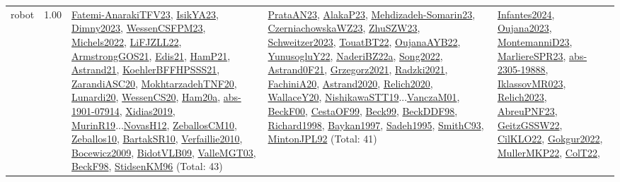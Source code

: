 {\begin{longtable}{p{3cm}r>{\raggedright\arraybackslash}p{6cm}>{\raggedright\arraybackslash}p{6cm}>{\raggedright\arraybackslash}p{8cm}}
\index{robot}\index{ApplicationAreas!robot}robot &  1.00 & \hyperref[detail:Fatemi-AnarakiTFV23]{Fatemi-AnarakiTFV23}, \hyperref[detail:IsikYA23]{IsikYA23}, \hyperref[detail:Dimny2023]{Dimny2023}, \hyperref[detail:WessenCSFPM23]{WessenCSFPM23}, \hyperref[detail:Michels2022]{Michels2022}, \hyperref[detail:LiFJZLL22]{LiFJZLL22}, \hyperref[detail:ArmstrongGOS21]{ArmstrongGOS21}, \hyperref[detail:Edis21]{Edis21}, \hyperref[detail:HamP21]{HamP21}, \hyperref[detail:Astrand21]{Astrand21}, \hyperref[detail:KoehlerBFFHPSSS21]{KoehlerBFFHPSSS21}, \hyperref[detail:ZarandiASC20]{ZarandiASC20}, \hyperref[detail:MokhtarzadehTNF20]{MokhtarzadehTNF20}, \hyperref[detail:Lunardi20]{Lunardi20}, \hyperref[detail:WessenCS20]{WessenCS20}, \hyperref[detail:Ham20a]{Ham20a}, \hyperref[detail:abs-1901-07914]{abs-1901-07914}, \hyperref[detail:Xidias2019]{Xidias2019}, \hyperref[detail:MurinR19]{MurinR19}...\hyperref[detail:NovasH12]{NovasH12}, \hyperref[detail:ZeballosCM10]{ZeballosCM10}, \hyperref[detail:Zeballos10]{Zeballos10}, \hyperref[detail:BartakSR10]{BartakSR10}, \hyperref[detail:Verfaillie2010]{Verfaillie2010}, \hyperref[detail:Bocewicz2009]{Bocewicz2009}, \hyperref[detail:BidotVLB09]{BidotVLB09}, \hyperref[detail:ValleMGT03]{ValleMGT03}, \hyperref[detail:BeckF98]{BeckF98}, \hyperref[detail:StidsenKM96]{StidsenKM96} (Total: 43) & \hyperref[detail:PrataAN23]{PrataAN23}, \hyperref[detail:AlakaP23]{AlakaP23}, \hyperref[detail:Mehdizadeh-Somarin23]{Mehdizadeh-Somarin23}, \hyperref[detail:CzerniachowskaWZ23]{CzerniachowskaWZ23}, \hyperref[detail:ZhuSZW23]{ZhuSZW23}, \hyperref[detail:Schweitzer2023]{Schweitzer2023}, \hyperref[detail:TouatBT22]{TouatBT22}, \hyperref[detail:OujanaAYB22]{OujanaAYB22}, \hyperref[detail:YunusogluY22]{YunusogluY22}, \hyperref[detail:NaderiBZ22a]{NaderiBZ22a}, \hyperref[detail:Song2022]{Song2022}, \hyperref[detail:Astrand0F21]{Astrand0F21}, \hyperref[detail:Grzegorz2021]{Grzegorz2021}, \hyperref[detail:Radzki2021]{Radzki2021}, \hyperref[detail:FachiniA20]{FachiniA20}, \hyperref[detail:Astrand2020]{Astrand2020}, \hyperref[detail:Relich2020]{Relich2020}, \hyperref[detail:WallaceY20]{WallaceY20}, \hyperref[detail:NishikawaSTT19]{NishikawaSTT19}...\hyperref[detail:VanczaM01]{VanczaM01}, \hyperref[detail:BeckF00]{BeckF00}, \hyperref[detail:CestaOF99]{CestaOF99}, \hyperref[detail:Beck99]{Beck99}, \hyperref[detail:BeckDDF98]{BeckDDF98}, \hyperref[detail:Richard1998]{Richard1998}, \hyperref[detail:Baykan1997]{Baykan1997}, \hyperref[detail:Sadeh1995]{Sadeh1995}, \hyperref[detail:SmithC93]{SmithC93}, \hyperref[detail:MintonJPL92]{MintonJPL92} (Total: 41) & \hyperref[detail:Infantes2024]{Infantes2024}, \hyperref[detail:Oujana2023]{Oujana2023}, \hyperref[detail:MontemanniD23]{MontemanniD23}, \hyperref[detail:MarliereSPR23]{MarliereSPR23}, \hyperref[detail:abs-2305-19888]{abs-2305-19888}, \hyperref[detail:IklassovMR023]{IklassovMR023}, \hyperref[detail:Relich2023]{Relich2023}, \hyperref[detail:AbreuPNF23]{AbreuPNF23}, \hyperref[detail:GeitzGSSW22]{GeitzGSSW22}, \hyperref[detail:CilKLO22]{CilKLO22}, \hyperref[detail:Gokgur2022]{Gokgur2022}, \hyperref[detail:MullerMKP22]{MullerMKP22}, \hyperref[detail:ColT22]{ColT22}, 
\end{longtable}}
